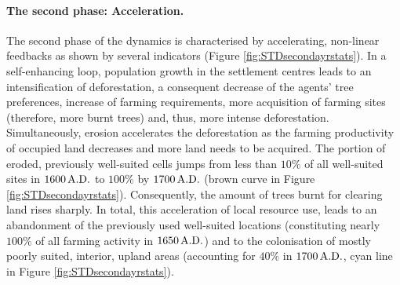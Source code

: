 \paragraph{The second phase: Acceleration.}
The second phase of the dynamics is characterised by accelerating, non-linear feedbacks as shown by several indicators (Figure \ref{fig:STDsecondayrstats}).
In a self-enhancing loop, population growth in the settlement centres leads to an intensification of deforestation, a consequent decrease of the agents' tree preferences, increase of farming requirements, more acquisition of farming sites (therefore, more burnt trees) and, thus, more intense deforestation.
Simultaneously, erosion accelerates the deforestation as the farming productivity of occupied land decreases and  more land needs to be acquired.
The portion of eroded, previously well-suited cells jumps from less than $10\%$ of all well-suited sites in $1600\,{\rm A.D.}$ to $100\%$ by $1700\, {\rm A.D.}$ (brown curve in Figure \ref{fig:STDsecondayrstats}).
Consequently, the amount of trees burnt for clearing land rises sharply. %
In total, this acceleration of local resource use, leads to an abandonment of the previously used well-suited locations (constituting nearly $100\%$ of all farming activity in $1650\,{\rm A.D.}$) and to the colonisation of mostly poorly suited, interior, upland areas (accounting for $40\%$ in $1700\,{\rm A.D.}$, cyan line in Figure \ref{fig:STDsecondayrstats}).

